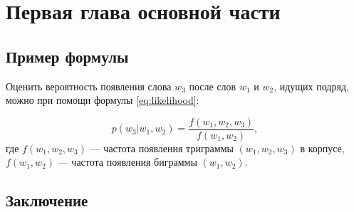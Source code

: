 \chapter{Первая глава основной части}\label{chap:1}

\section{Пример формулы}

Оценить вероятность появления слова $w_3$ после слов $w_1$ и $w_2$, идущих подряд, можно при помощи формулы \ref{eq:likelihood}:

\begin{equation}
  p(w_3|w_1,w_2) = \frac{f(w_1, w_2, w_3)}{f(w_1, w_2)},
  \label{eq:likelihood}
\end{equation}
%
где $f(w_1, w_2, w_3)$ --- частота появления триграммы $(w_1, w_2, w_3)$ в корпусе, $f(w_1, w_2)$ --- частота появления биграммы $(w_1, w_2)$.

\section{Заключение}

